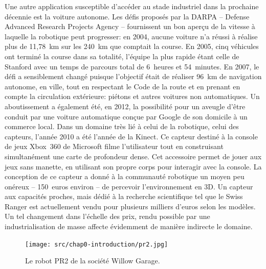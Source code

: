 Une autre application susceptible d'accéder au stade industriel dans
la prochaine décennie est la voiture autonome. Les défis proposés par
la DARPA -- Defense Advanced Research Projects Agency -- fournissent
un bon aperçu de la vitesse à laquelle la robotique peut progresser:
en 2004, aucune voiture n'a réussi à réalise plus de 11,78 km sur les
240 km que comptait la course. En 2005, cinq véhicules ont terminé la
course dans sa totalité, l'équipe la plus rapide étant celle de
Stanford avec un temps de parcours total de 6 heures et 54 minutes. En
2007, le défi a sensiblement changé puisque l'objectif était de
réaliser 96 km de navigation autonome, en ville, tout en respectant le
Code de la route et en prenant en compte la circulation extérieure:
piétons et autres voitures non automatiques. Un aboutissement a
également été, en 2012, la possibilité pour un aveugle d'être
conduit par une voiture automatique conçue par Google de son domicile
à un commerce local. Dans un domaine très lié à celui de la robotique,
celui des capteurs, l'année 2010 a été l'année de la
Kinect. Ce capteur destiné à la console de
jeux Xbox 360 de Microsoft filme l'utilisateur tout en construisant
simultanément une carte de profondeur dense. Cet accessoire permet de
jouer aux jeux sans manette, en utilisant son propre corps pour
interagir avec la console. La conception de ce capteur a donné à la
communauté robotique un moyen peu onéreux -- 150 euros environ -- de
percevoir l'environnement en 3D. Un capteur aux capacités proches,
mais dédié à la recherche scientifique tel que le Swiss
Ranger est actuellement vendu pour plusieurs
milliers d'euros selon les modèles. Un tel changement dans l'échelle
des prix, rendu possible par une industrialisation de masse affecte
évidemment de manière indirecte le domaine.


\begin{figure}
  \begin{center}
    \texttt{[image: src/chap0-introduction/pr2.jpg]}
  \end{center}
  \caption{Le robot PR2 de la société Willow Garage. \label{fig:pr2}}
\end{figure}


